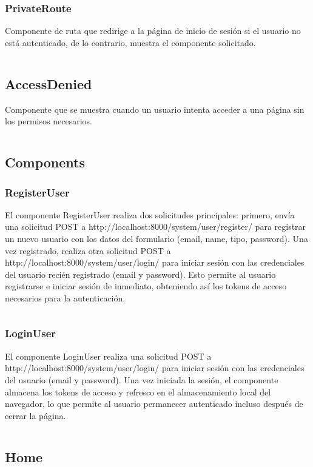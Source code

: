 \documentclass{article}
\begin{document}
\subsubsection{PrivateRoute}
Componente de ruta que redirige a la página de inicio de sesión si el usuario no está autenticado, de lo contrario, muestra el componente solicitado.
\inputminted{javascript}{../fronted/src/components/PrivateRoute.jsx}
\subsection{AccessDenied}
Componente que se muestra cuando un usuario intenta acceder a una página sin los permisos necesarios.
\inputminted{javascript}{../fronted/src/components/AccessDenied.jsx}
\subsection{Components}
\subsubsection{RegisterUser}
El componente RegisterUser realiza dos solicitudes principales: primero, envía una solicitud POST a http://localhost:8000/system/user/register/ para registrar un nuevo usuario con los datos del formulario (email, name, tipo, password). Una vez registrado, realiza otra solicitud POST a http://localhost:8000/system/user/login/ para iniciar sesión con las credenciales del usuario recién registrado (email y password). Esto permite al usuario registrarse e iniciar sesión de inmediato, obteniendo así los tokens de acceso necesarios para la autenticación.
\inputminted{javascript}{../fronted/src/components/RegisterUser.jsx}
\subsubsection{LoginUser}
El componente LoginUser realiza una solicitud POST a http://localhost:8000/system/user/login/ para iniciar sesión con las credenciales del usuario (email y password). Una vez iniciada la sesión, el componente almacena los tokens de acceso y refresco en el almacenamiento local del navegador, lo que permite al usuario permanecer autenticado incluso después de cerrar la página.
\inputminted{javascript}{../fronted/src/components/LoginUser.jsx}

\subsection{Home}
\end{document}
